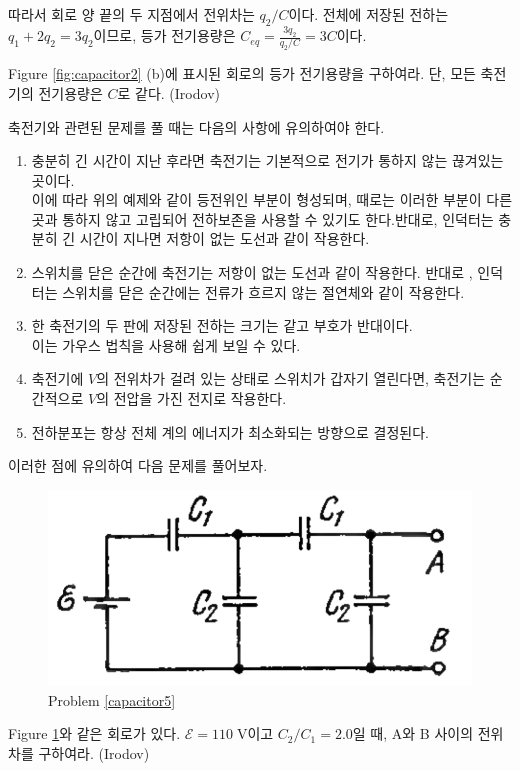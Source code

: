 따라서 회로 양 끝의 두 지점에서 전위차는 $q_2/C$이다. 전체에 저장된 전하는 $q_1+2q_2=3q_2$이므로, 등가 전기용량은 $C_{eq}=\frac{3q_2}{q_2/C}=3C$이다.
\begin{exercise}
Figure \ref{fig:capacitor2} (b)에 표시된 회로의 등가 전기용량을 구하여라. 단, 모든 축전기의 전기용량은 $C$로 같다. (Irodov)
\end{exercise}
축전기와 관련된 문제를 풀 때는 다음의 사항에 유의하여야 한다.
\begin{enumerate}
\item 충분히 긴 시간이 지난 후라면 축전기는 기본적으로 전기가 통하지 않는 끊겨있는 곳이다. \\이에 따라 위의 예제와 같이 등전위인 부분이 형성되며, 때로는 이러한 부분이 다른 곳과 통하지 않고 고립되어 전하보존을 사용할 수 있기도 한다.반대로, 인덕터는 충분히 긴 시간이 지나면 저항이 없는 도선과 같이 작용한다.
\item 스위치를 닫은 순간에 축전기는 저항이 없는 도선과 같이 작용한다. 반대로 , 인덕터는 스위치를 닫은 순간에는 전류가 흐르지 않는 절연체와 같이 작용한다.
\item 한 축전기의 두 판에 저장된 전하는 크기는 같고 부호가 반대이다.\\이는 가우스 법칙을 사용해 쉽게 보일 수 있다.
\item 축전기에 $V$의 전위차가 걸려 있는 상태로 스위치가 갑자기 열린다면, 축전기는 순간적으로 $V$의 전압을 가진 전지로 작용한다.
\item 전하분포는 항상 전체 계의 에너지가 최소화되는 방향으로 결정된다.
\end{enumerate}
이러한 점에 유의하여 다음 문제를 풀어보자.
\begin{figure}[h]
\centering\includegraphics[scale=0.2]{Pictures/capacitor5.PNG}
\caption{Problem \ref{capacitor5}}
\label{fig:capacitor5}
\end{figure}
\begin{exercise}\label{capacitor5}

Figure \ref{fig:capacitor5}와 같은 회로가 있다. $\mathcal{E}=110\mathrm{\;V}$이고 $C_2/C_1=2.0$일 때, A와 B 사이의 전위차를 구하여라. (Irodov)
\end{exercise}

